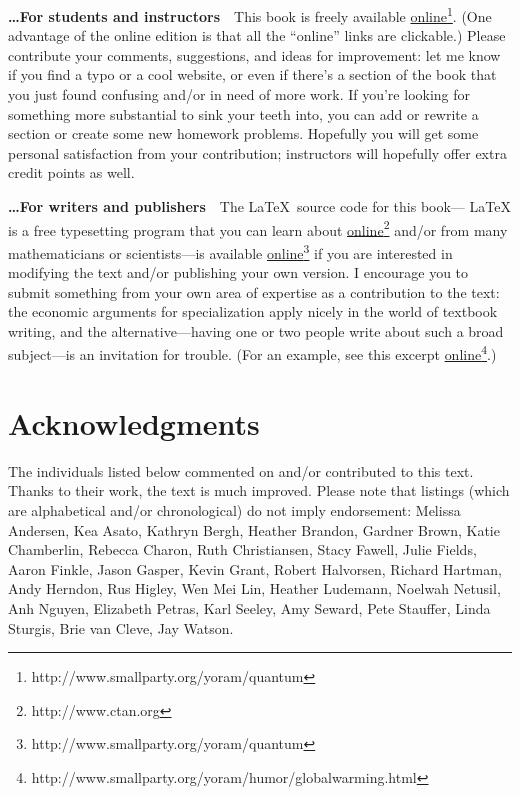 \smallskip
\noindent\textbf{\ldots For students and instructors}\ \ This book is freely available \href{http://www.smallparty.org/yoram/quantum}{online}\footnote{http://www.smallparty.org/yoram/quantum}. (One advantage of the online edition is that all the ``online'' links are clickable.) Please contribute your comments, suggestions, and ideas for improvement: let me know if you find a typo or a cool website, or even if there's a section of the book that you just found confusing and/or in need of more work. If you're looking for something more substantial to sink your teeth into, you can add or rewrite a section or create some new homework problems. Hopefully you will get some personal satisfaction from your contribution; instructors will hopefully offer extra credit points as well.


\smallskip
\noindent\textbf{\ldots For writers and publishers}\ \ The \LaTeX\ source code for this book--- \LaTeX{} is a free typesetting program that you can learn about \href{http://www.ctan.org}{online}\footnote{http://www.ctan.org} and/or from many mathematicians or scientists---is available \href{http://www.smallparty.org/yoram/quantum}{online}\footnote{http://www.smallparty.org/yoram/quantum} if you are interested in modifying the text and/or publishing your own version. I encourage you to submit something from your own area of expertise as a contribution to the text: the economic arguments for specialization apply nicely in the world of textbook writing, and the alternative---having one or two people write about such a broad subject---is an invitation for trouble. (For an example, see this excerpt \href{http://www.smallparty.org/yoram/humor/globalwarming.html}{online}\footnote{http://www.smallparty.org/yoram/humor/globalwarming.html}.) 


\section*{Acknowledgments}

The individuals listed below commented on and/or contributed to this text. Thanks to their work, the text is much improved. Please note that listings (which are alphabetical and/or chronological) do not imply endorsement: Melissa Andersen, Kea Asato, Kathryn Bergh, Heather Brandon, Gardner Brown, Katie Chamberlin, Rebecca Charon, Ruth Christiansen, Stacy Fawell, Julie Fields, Aaron Finkle, Jason Gasper, Kevin Grant, Robert Halvorsen, Richard Hartman, Andy Herndon, Rus Higley, Wen Mei Lin, Heather Ludemann, Noelwah Netusil, Anh Nguyen, Elizabeth Petras, Karl Seeley, Amy Seward, Pete Stauffer, Linda Sturgis, Brie van Cleve, Jay Watson.







